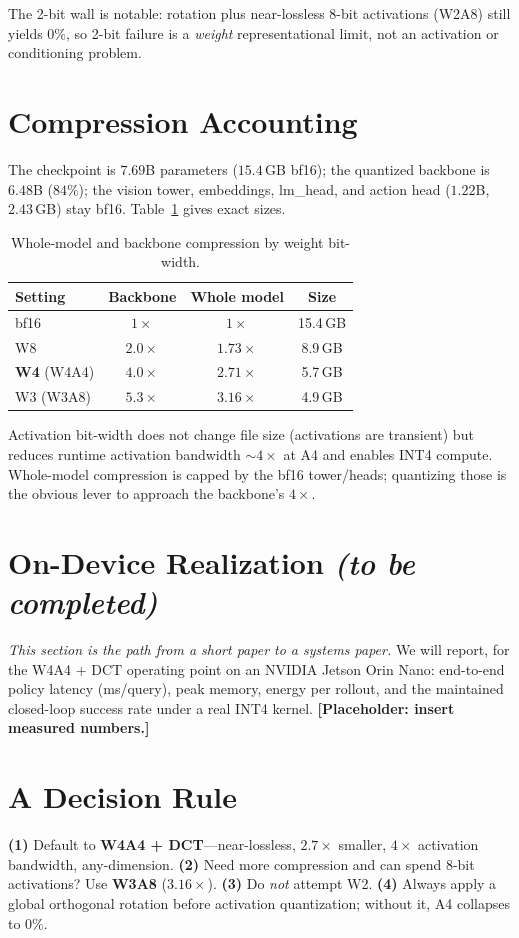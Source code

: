 \documentclass[conference]{IEEEtran}
\begin{document}
The 2-bit wall is notable: rotation plus near-lossless 8-bit activations (W2A8) still yields
$0\%$, so 2-bit failure is a \emph{weight} representational limit, not an activation or
conditioning problem.

\section{Compression Accounting}
The checkpoint is $7.69$B parameters ($15.4$\,GB bf16); the quantized backbone is $6.48$B
($84\%$); the vision tower, embeddings, lm\_head, and action head ($1.22$B, $2.43$\,GB) stay
bf16. Table~\ref{tab:size} gives exact sizes.

\begin{table}[h]\centering
\caption{Whole-model and backbone compression by weight bit-width.}
\label{tab:size}
\begin{tabular}{lccc}
\toprule
Setting & Backbone & Whole model & Size \\
\midrule
bf16 & $1\times$ & $1\times$ & 15.4\,GB \\
W8 & $2.0\times$ & $1.73\times$ & 8.9\,GB \\
\textbf{W4} (W4A4) & $4.0\times$ & $2.71\times$ & 5.7\,GB \\
W3 (W3A8) & $5.3\times$ & $3.16\times$ & 4.9\,GB \\
\bottomrule
\end{tabular}
\end{table}

Activation bit-width does not change file size (activations are transient) but reduces
runtime activation bandwidth $\sim\!4\times$ at A4 and enables INT4 compute. Whole-model
compression is capped by the bf16 tower/heads; quantizing those is the obvious lever to
approach the backbone's $4\times$.

\section{On-Device Realization \emph{(to be completed)}}
\emph{This section is the path from a short paper to a systems paper.} We will report, for the
W4A4 + DCT operating point on an NVIDIA Jetson Orin Nano: end-to-end policy latency
(ms/query), peak memory, energy per rollout, and the maintained closed-loop success rate
under a real INT4 kernel. \textbf{[Placeholder: insert measured numbers.]}

\section{A Decision Rule}
\textbf{(1)} Default to \textbf{W4A4 + DCT}---near-lossless, $2.7\times$ smaller, $4\times$
activation bandwidth, any-dimension. \textbf{(2)} Need more compression and can spend $8$-bit
activations? Use \textbf{W3A8} ($3.16\times$). \textbf{(3)} Do \emph{not} attempt W2.
\textbf{(4)} Always apply a global orthogonal rotation before activation quantization; without
it, A4 collapses to $0\%$.
\end{document}
